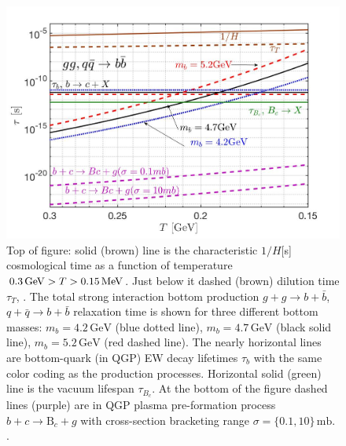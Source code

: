 \begin{figure} 
\centerline{\includegraphics[width=0.85\linewidth]{./plots/BQuarkReactionTime003}}
\caption{{\color{black}Top of figure: solid (brown) line is the characteristic $1/H$[s] cosmological time as a function of temperature $0.3\,\mathrm{GeV}>T> 0.15\text{\,MeV}$. Just below it dashed (brown) dilution time $\tau_T$, . The total strong interaction bottom production $g+g\to b+\bar{b}$, $q+\bar q\to b+\bar{b}$ relaxation time is shown for three different bottom masses: $m_b=4.2\,\mathrm{GeV}$ (blue dotted line), $m_b=4.7\,\mathrm{GeV}$ (black solid line), $m_b=5.2\,\mathrm{GeV}$ (red dashed line). The nearly horizontal lines are bottom-quark (in QGP) EW decay lifetimes $\tau_b$ with the same color coding as the production processes. Horizontal solid (green) line is the vacuum lifespan $\tau_{B_c}$. At the bottom of the figure dashed lines (purple) are in QGP plasma pre-formation process $b+c\rightarrow \mathrm{B}_c+g$ with cross-section bracketing range $\sigma=\{0.1,10\} \,\mathrm{mb}$. .
}}
\label{ReactionTime}
\end{figure}

